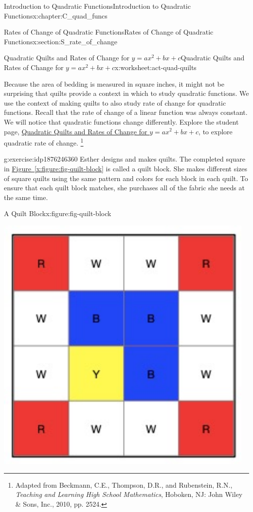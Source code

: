 \documentclass[oneside,10pt,]{book}
\newcommand{\xreffont}{\relax}
\newcommand{\pubtitle}[1]{\textsl{#1}}
\numberwithin{equation}{chapter}
\begin{document}
\begin{chapterptx}{Introduction to Quadratic Functions}{}{Introduction to Quadratic Functions}{}{}{x:chapter:C_quad_funcs}
\begin{sectionptx}{Rates of Change of Quadratic Functions}{}{Rates of Change of Quadratic Functions}{}{}{x:section:S_rate_of_change}
\begin{worksheet-subsection}{Quadratic Quilts and Rates of Change for \(y = ax^2 + bx + c\)}{}{Quadratic Quilts and Rates of Change for \(y = ax^2 + bx + c\)}{}{}{x:worksheet:act-quad-quilts}
\begin{introduction}{}%
Because the area of bedding is measured in square inches, it might not be surprising that quilts provide a context in which to study quadratic functions. We use the context of making quilts to also study rate of change for quadratic functions. Recall that the rate of change of a linear function was always constant. We will notice that quadratic functions change differently. Explore the student page, \hyperref[x:worksheet:act-quad-quilts]{Quadratic Quilts and Rates of Change for \(y = ax^2 + bx + c\)}, to explore quadratic rate of change. \footnote{Adapted from Beckmann, C.E., Thompson, D.R., and Rubenstein, R.N., \pubtitle{Teaching and Learning High School Mathematics}, Hoboken, NJ: John Wiley \& Sons, Inc., 2010, pp. 252\textemdash{}4.\label{g:fn:idp1876246872}}%
\end{introduction}%
\begin{divisionexercise}{1}{}{}{g:exercise:idp1876246360}%
Esther designs and makes quilts. The completed square in \hyperref[x:figure:fig-quilt-block]{Figure~{\xreffont\ref{x:figure:fig-quilt-block}}} is called a quilt block. She makes different sizes of square quilts using the same pattern and colors for each block in each quilt. To ensure that each quilt block matches, she purchases all of the fabric she needs at the same time.%
\begin{figureptx}{A Quilt Block}{x:figure:fig-quilt-block}{}%
\begin{image}{0.35}{0.3}{0.35}%
\includegraphics[width=\linewidth]{external/quilt-block.pdf}

\end{image}
\end{figureptx}
\end{divisionexercise}
\end{worksheet-subsection}
\end{sectionptx}
\end{chapterptx}
\end{document}

